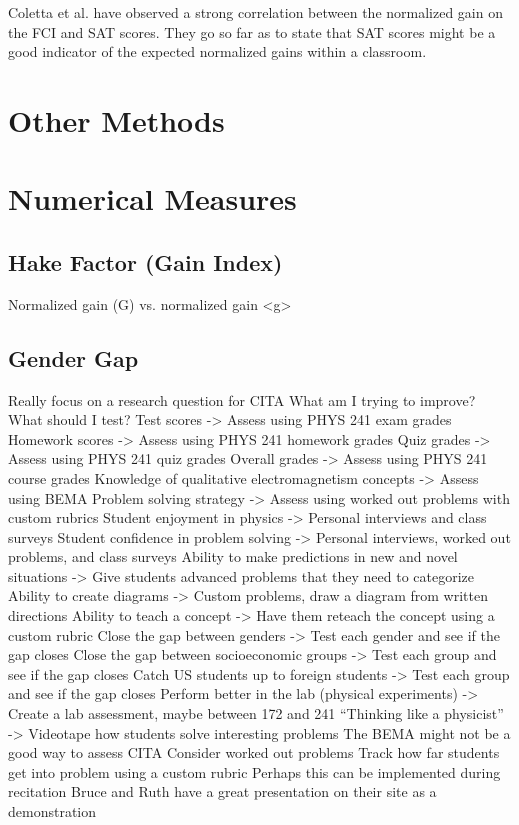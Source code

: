 Coletta et al. have observed a strong correlation between the normalized gain on the FCI and SAT scores. They go so far as to state that SAT scores might be a good indicator of the expected normalized gains within a classroom\cite{coletta2007}.

\section{Other Methods}

\section{Numerical Measures}

\subsection{Hake Factor (Gain Index)}

Normalized gain (G) vs. normalized gain <g>

\subsection{Gender Gap}

Really focus on a research question for CITA
What am I trying to improve? What should I test?
Test scores -> Assess using PHYS 241 exam grades
Homework scores -> Assess using PHYS 241 homework grades
Quiz grades -> Assess using PHYS 241 quiz grades
Overall grades -> Assess using PHYS 241 course grades
Knowledge of qualitative electromagnetism concepts -> Assess using BEMA
Problem solving strategy -> Assess using worked out problems with custom rubrics
Student enjoyment in physics -> Personal interviews and class surveys
Student confidence in problem solving -> Personal interviews, worked out problems, and class surveys
Ability to make predictions in new and novel situations -> Give students advanced problems that they need to categorize
Ability to create diagrams -> Custom problems, draw a diagram from written directions
Ability to teach a concept -> Have them reteach the concept using a custom rubric
Close the gap between genders -> Test each gender and see if the gap closes
Close the gap between socioeconomic groups -> Test each group and see if the gap closes
Catch US students up to foreign students -> Test each group and see if the gap closes
Perform better in the lab (physical experiments) -> Create a lab assessment, maybe between 172 and 241
“Thinking like a physicist” -> Videotape how students solve interesting problems
The BEMA might not be a good way to assess CITA
Consider worked out problems
Track how far students get into problem using a custom rubric
Perhaps this can be implemented during recitation
Bruce and Ruth have a great presentation on their site as a demonstration